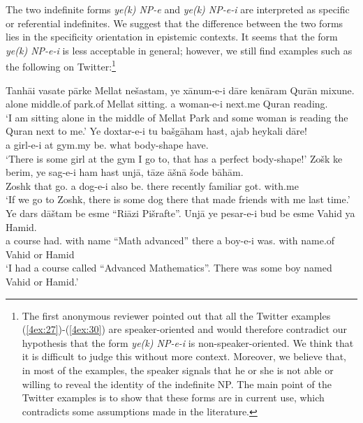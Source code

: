 \documentclass[output=paper]{langsci/langscibook}
\begin{document}
The two indefinite forms {\emph{ye(k) NP-e}} and {\emph{ye(k) NP-e-i}} are interpreted as specific or referential indefinites. We suggest that the difference between the two forms lies in the specificity orientation in epistemic contexts. It seems that the form {\emph{ye(k) NP-e-i}} is less acceptable in general; however, we still find examples such as the following on Twitter:\footnote{{The first anonymous reviewer pointed out that all the Twitter examples (\ref{4ex:27})-(\ref{4ex:30}) are speaker-oriented and would therefore contradict our hypothesis that the form {\emph{ye(k) NP-e-i}} is non-speaker-oriented. We think that it is difficult to judge this without more context. Moreover, we believe that, in most of the examples, the speaker signals that he or she is not able or willing to reveal the identity of the indefinite NP. The main point of the Twitter examples is to show that these forms are in current use, which contradicts some assumptions made in the literature.}}

\begin{exe}
\ex\label{4ex:27}
\gll	Tanhāi	vasate 	pārke  Mellat	nešastam,		ye xānum-e-i	dāre	 kenāram		Qurān 	mixune. \\
	alone	middle.of 	park.of Mellat	sitting.{}	a woman-e-i	{} next.me	Quran 	reading.{} \\
\glt	`I am sitting alone in the middle of Mellat Park and some woman is reading the Quran next to me.'
\ex\label{4ex:28}
\gll	Ye doxtar-e-i	tu bašgāham	hast,		ajab	heykali			dāre! \\
	a  girl-e-i		at gym.my		be.{} what	body-shape		have.{} \\
\glt	`There is some girl at the gym I go to, that has a perfect body-shape!'
\ex\label{4ex:29}
\gll	Zošk		ke	berim, 	ye sag-e-i	ham hast 		unjā,		tāze			āšnā		šode			bāhām. \\
	Zoshk	that	go.{}	a dog-e-i 	also  be.{} 	there 	recently 		familiar 		got.{}		with.me \\
\glt	`If we go to Zoshk, there is some dog there that made friends with me last time.'
\ex\label{4ex:30}
\gll	Ye dars		dāštam be esme ``Riāzi Pišrafte''.		Unjā			ye pesar-e-i	 bud	be	esme		Vahid	ya	Hamid. \\
	a   course	had.{} with name ``Math advanced''	there 	a boy-e-i	was.{}	with	name.of	Vahid 	or Hamid \\
\glt	`I had a course called ``Advanced Mathematics''. There was some boy named Vahid or Hamid.'
\end{exe}
\end{document}
